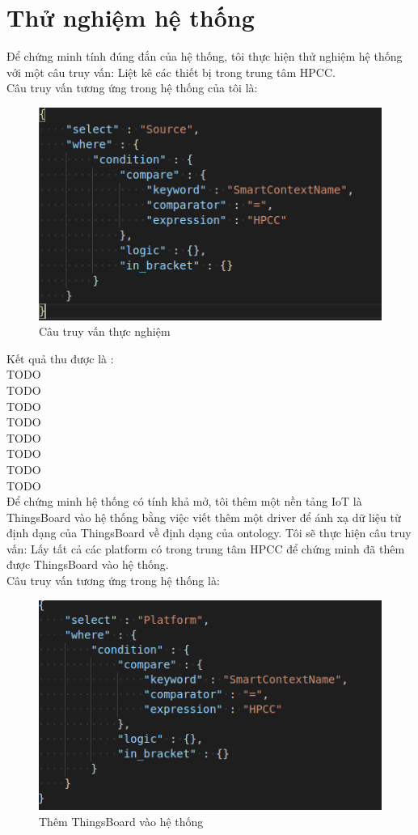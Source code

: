 \chapter{Thử nghiệm hệ thống}

Để chứng minh tính đúng đắn của hệ thống, tôi thực hiện thử nghiệm hệ thống với một câu truy vấn: Liệt kê các thiết bị trong trung tâm HPCC. \\

Câu truy vấn tương ứng trong hệ thống của tôi là:
\begin{figure}
	\center
	\includegraphics[scale=0.5]{image/demo_query}
	\caption{Câu truy vấn thực nghiệm}
\end{figure}

Kết quả thu được là :\\


TODO\\
TODO \\
TODO\\
TODO\\
TODO\\
TODO\\
TODO\\
TODO\\



Để chứng minh hệ thống có tính khả mở, tôi thêm một nền tảng IoT là ThingsBoard vào hệ thống bằng việc viết thêm một driver để ánh xạ dữ liệu từ định dạng của ThingsBoard về định dạng của ontology. Tôi sẽ thực hiện câu truy vấn: Lấy tất cả các platform có trong trung tâm HPCC để chứng minh đã thêm được ThingsBoard vào hệ thống. \\

Câu truy vấn tương ứng trong hệ thống là:
\begin{figure}
	\center
	\includegraphics[scale=0.5]{image/add_thingsboard}
	\caption{Thêm ThingsBoard vào hệ thống}
\end{figure}

